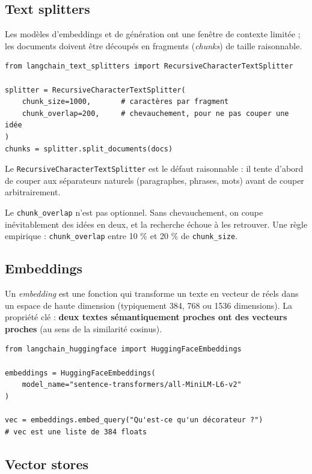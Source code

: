 \documentclass[11pt,a4paper]{article}
\begin{document}
\subsection{Text splitters}

Les modèles d'embeddings et de génération ont une fenêtre de contexte limitée ; les documents doivent être découpés en fragments (\emph{chunks}) de taille raisonnable.

\begin{verbatim}
from langchain_text_splitters import RecursiveCharacterTextSplitter

splitter = RecursiveCharacterTextSplitter(
    chunk_size=1000,       # caractères par fragment
    chunk_overlap=200,     # chevauchement, pour ne pas couper une idée
)
chunks = splitter.split_documents(docs)
\end{verbatim}

Le \texttt{Recursive\-CharacterTextSplitter} est le défaut raisonnable : il tente d'abord de couper aux séparateurs naturels (paragraphes, phrases, mots) avant de couper arbitrairement.

\begin{piege}
Le \texttt{chunk\_overlap} n'est pas optionnel. Sans chevauchement, on coupe inévitablement des idées en deux, et la recherche échoue à les retrouver. Une règle empirique : \texttt{chunk\_overlap} entre 10 \% et 20 \% de \texttt{chunk\_size}.
\end{piege}

\subsection{Embeddings}

Un \emph{embedding} est une fonction qui transforme un texte en vecteur de réels dans un espace de haute dimension (typiquement 384, 768 ou 1536 dimensions). La propriété clé : \textbf{deux textes sémantiquement proches ont des vecteurs proches} (au sens de la similarité cosinus).

\begin{verbatim}
from langchain_huggingface import HuggingFaceEmbeddings

embeddings = HuggingFaceEmbeddings(
    model_name="sentence-transformers/all-MiniLM-L6-v2"
)

vec = embeddings.embed_query("Qu'est-ce qu'un décorateur ?")
# vec est une liste de 384 floats
\end{verbatim}

\subsection{Vector stores}
\end{document}
